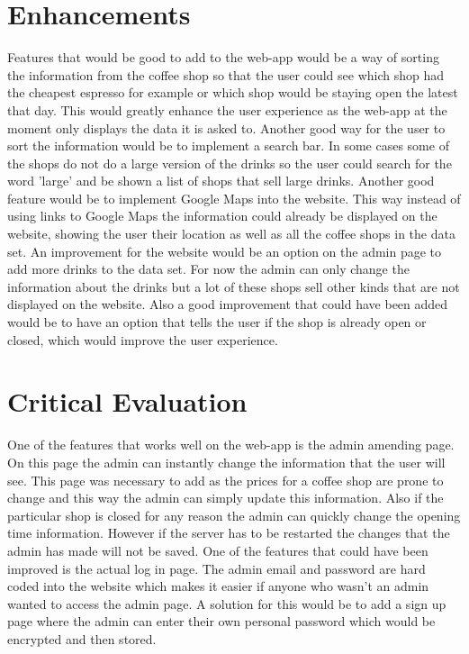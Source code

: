 \documentclass[10pt, a4paper]{article}
\begin{document}
	\section{Enhancements}
	    Features that would be good to add to the web-app would be a way of sorting the information from the coffee shop so that the user could see which shop had the cheapest espresso for example or which shop would be staying open the latest that day.  This would greatly enhance the user experience as the web-app at the moment only displays the data it is asked to.  Another good way for the user to sort the information would be to implement a search bar.  In some cases some of the shops do not do a large version of the drinks so the user could search for the word 'large' and be shown a list of shops that sell large drinks.  Another good feature would be to implement Google Maps into the website.  This way instead of using links to Google Maps the information could already be displayed on the website, showing the user their location as well as all the coffee shops in the data set.  An improvement for the website would be an option on the admin page to add more drinks to the data set.  For now the admin can only change the information about the drinks but a lot of these shops sell other kinds that are not displayed on the website.  Also a good improvement that could have been added would be to have an option that tells the user if the shop is already open or closed, which would improve the user experience.
	\section{Critical Evaluation}
        One of the features that works well on the web-app is the admin amending page.  On this page the admin can instantly change the information that the user will see.  This page was necessary to add as the prices for a coffee shop are prone to change and this way the admin can simply update this information.  Also if the particular shop is closed for any reason the admin can quickly change the opening time information.  However if the server has to be restarted the changes that the admin has made will not be saved.  One of the features that could have been improved is the actual log in page.  The admin email and password are hard coded into the website which makes it easier if anyone who wasn't an admin wanted to access the admin page.  A solution for this would be to add a sign up page where the admin can enter their own personal password which would be encrypted and then stored.    
\end{document}
